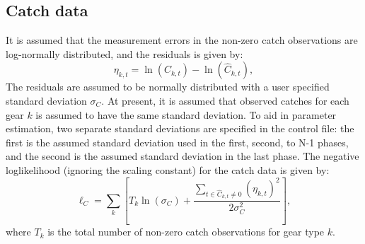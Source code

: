 \subsection{Catch data}
It is assumed that the measurement errors in the non-zero catch observations are log-normally distributed, and the residuals is given by:
\begin{equation}\label{eq2}
\eta_{k,t}=\ln(C_{k,t}) -  \ln(\hat{C}_{k,t}),
\end{equation}
The residuals are assumed to be normally distributed with a user specified standard deviation $\sigma_{C}$.  At present, it is assumed that observed catches for each gear $k$ is assumed to have the same standard deviation.  To aid in parameter estimation, two separate standard deviations are specified in the control file: the first is the assumed standard deviation used in the first, second, to N-1 phases, and the second is the assumed standard deviation in the last phase.  The negative loglikelihood (ignoring the scaling constant) for the catch data is given by:
\begin{equation}\label{eq3}
\ell_C = \sum_k\left[  T_k\ln(\sigma_C)+\dfrac{\sum_{t \in \hat{C}_{k,t}\neq 0}(\eta_{k,t})^2}{2\sigma_C^2}\right],
\end{equation}
where $T_k$ is the total number of non-zero catch observations for gear type $k$.


